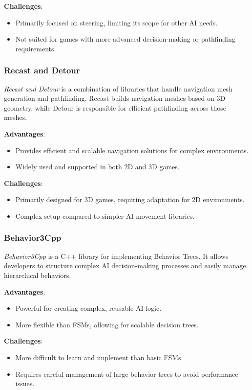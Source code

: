 \textbf{Challenges}:
\begin{itemize}
    \item Primarily focused on steering, limiting its scope for other AI needs.
    \item Not suited for games with more advanced decision-making or pathfinding requirements.
\end{itemize}

\subsubsection{Recast and Detour}

\textit{Recast and Detour} is a combination of libraries that handle navigation mesh generation and pathfinding. Recast builds navigation meshes based on 3D geometry, while Detour is responsible for efficient pathfinding across those meshes.

\textbf{Advantages}:
\begin{itemize}
    \item Provides efficient and scalable navigation solutions for complex environments.
    \item Widely used and supported in both 2D and 3D games.
\end{itemize}

\textbf{Challenges}:
\begin{itemize}
    \item Primarily designed for 3D games, requiring adaptation for 2D environments.
    \item Complex setup compared to simpler AI movement libraries.
\end{itemize}

\subsubsection{Behavior3Cpp}

\textit{Behavior3Cpp} is a C++ library for implementing Behavior Trees. It allows developers to structure complex AI decision-making processes and easily manage hierarchical behaviors.

\textbf{Advantages}:
\begin{itemize}
    \item Powerful for creating complex, reusable AI logic.
    \item More flexible than FSMs, allowing for scalable decision trees.
\end{itemize}

\textbf{Challenges}:
\begin{itemize}
    \item More difficult to learn and implement than basic FSMs.
    \item Requires careful management of large behavior trees to avoid performance issues.
\end{itemize}

